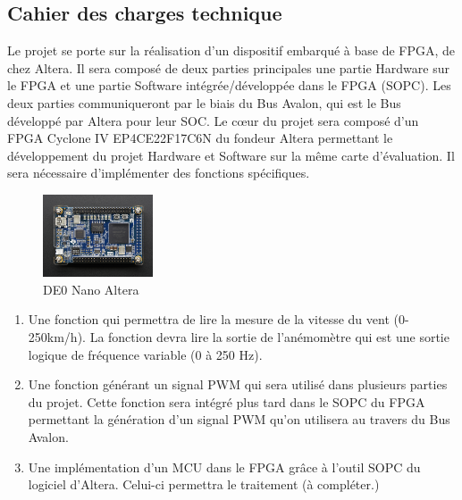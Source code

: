 \subsection{Cahier des charges technique}
Le projet se porte sur la réalisation d'un dispositif embarqué à base de FPGA, de chez Altera. Il sera composé de deux parties principales une partie Hardware sur le FPGA et une partie Software intégrée/développée dans le FPGA (SOPC). Les deux parties communiqueront par le biais du Bus Avalon, qui est le Bus développé par Altera pour leur SOC.
Le cœur du projet sera composé d'un FPGA Cyclone IV EP4CE22F17C6N du fondeur Altera permettant le développement du projet Hardware et Software sur la même carte d'évaluation. Il sera nécessaire d'implémenter des fonctions spécifiques.
\begin{figure}
    \begin{center}
      \includegraphics[angle=90, width=0.29\textwidth]{images/DE0.jpg}
      \caption{DE0 Nano Altera}
    \end{center}
  \end{figure}  
\begin{enumerate}
    \item Une fonction qui permettra de lire la mesure de la vitesse du vent (0-250km/h). La fonction devra lire la sortie de l'anémomètre qui est une sortie logique de fréquence variable (0 à 250 Hz). 
    \item Une fonction générant un signal PWM qui sera utilisé dans plusieurs parties du projet. Cette fonction sera intégré plus tard dans le SOPC du FPGA permettant la génération d'un signal PWM qu'on utilisera au travers du Bus Avalon.
    \item Une implémentation d'un MCU dans le FPGA grâce à l'outil SOPC du logiciel d'Altera. Celui-ci permettra le traitement (à compléter.)
\end{enumerate}
